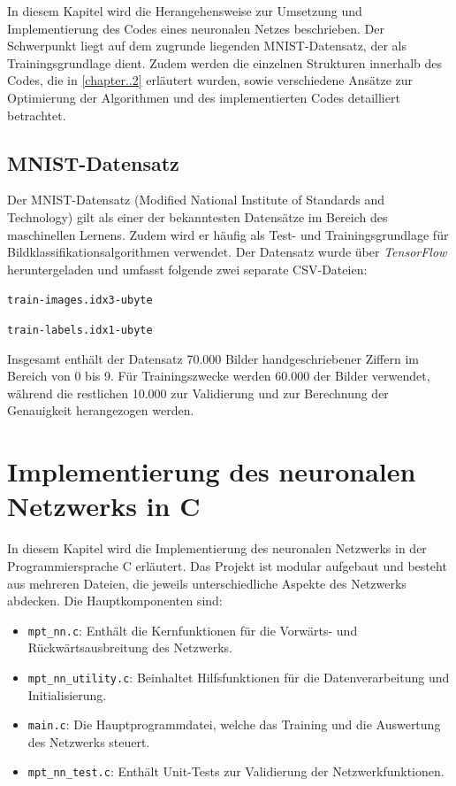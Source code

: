 \documentclass[a4paper, 12pt]{article}
\begin{document}
In diesem Kapitel wird die Herangehensweise zur Umsetzung und Implementierung des Codes eines 
neuronalen Netzes beschrieben. Der Schwerpunkt liegt auf dem zugrunde liegenden MNIST-Datensatz, 
der als Trainingsgrundlage dient. Zudem werden die einzelnen Strukturen innerhalb des Codes, die 
in \autoref{chapter..2} erläutert wurden, sowie verschiedene Ansätze zur Optimierung der 
Algorithmen und des implementierten Codes detailliert betrachtet.

\subsection{MNIST-Datensatz}\label{chapter..3.1}

Der MNIST-Datensatz (Modified National Institute of Standards and Technology) gilt als einer der 
bekanntesten Datensätze im Bereich des maschinellen Lernens. Zudem wird er häufig als Test- und 
Trainingsgrundlage für Bildklassifikationsalgorithmen verwendet. Der Datensatz wurde über 
\textit{TensorFlow} heruntergeladen und umfasst folgende zwei separate CSV-Dateien:

\begin{center}
	\texttt{train-images.idx3-ubyte}
\end{center}

\begin{center}
	\texttt{train-labels.idx1-ubyte}
\end{center}

Insgesamt enthält der Datensatz 70.000 Bilder handgeschriebener Ziffern im Bereich von 0 bis 9. 
Für Trainingszwecke werden 60.000 der Bilder verwendet, während die restlichen 10.000 zur 
Validierung und zur Berechnung der Genauigkeit herangezogen werden.
\newpage
\section{Implementierung des neuronalen Netzwerks in C}
\label{sec:implementierung}

In diesem Kapitel wird die Implementierung des neuronalen Netzwerks in der Programmiersprache C erläutert. 
Das Projekt ist modular aufgebaut und besteht aus mehreren Dateien, die jeweils unterschiedliche Aspekte des Netzwerks abdecken. Die Hauptkomponenten sind:

\begin{itemize}
    \item \texttt{mpt\_nn.c}: Enthält die Kernfunktionen für die Vorwärts- und Rückwärtsausbreitung des Netzwerks.
    \item \texttt{mpt\_nn\_utility.c}: Beinhaltet Hilfsfunktionen für die Datenverarbeitung und Initialisierung.
    \item \texttt{main.c}: Die Hauptprogrammdatei, welche das Training und die Auswertung des Netzwerks steuert.
    \item \texttt{mpt\_nn\_test.c}: Enthält Unit-Tests zur Validierung der Netzwerkfunktionen.
\end{itemize}
\end{document}
